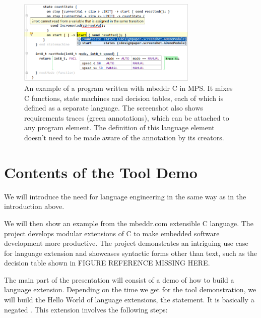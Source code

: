 \documentclass[10pt, conference, compsocconf]{IEEEtran}
\begin{document}
\begin{figure}[h]  
\includegraphics[width=8.6cm]{figures/screenshot.png}
\caption{An example of a program written with mbeddr C in MPS. It mixes C
functions, state machines and decision tables, each of which is defined as a separate
language. The screenshot also shows requirements traces (green annotations),
which can be attached to any program element. The definition of this language
element doesn't need to be made aware of the annotation by its creators.}
\label{screenshot}
\end{figure}

\section{Contents of the Tool Demo}

 We will introduce the need for language engineering in
the same way as in the introduction above. 

 We will then show an example from the mbeddr.com
extensible C language. The project develops modular extensions of
C to make embedded software development more productive. The project
demonstrates an intriguing use case for language extension and showcases
syntactic forms other than text, such as the decision table shown in FIGURE REFERENCE MISSING HERE.

 The main part of the presentation will consist of a demo of how to build a language extension. Depending on the time we get for the tool demonstration, we will build the Hello World of language extensions, the  statement. It is basically a negated . This extension involves the following steps:
\end{document}
